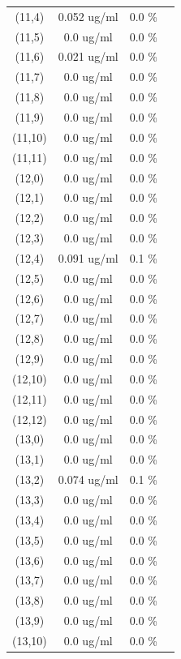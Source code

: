 \documentclass{article}
\begin{document}
\begin{tabular}{c c c c}
(11,4)&        0.052 ug/ml        &0.0 \%\\
(11,5)&        0.0 ug/ml        &0.0 \%\\
(11,6)&        0.021 ug/ml        &0.0 \%\\
(11,7)&        0.0 ug/ml        &0.0 \%\\
(11,8)&        0.0 ug/ml        &0.0 \%\\
(11,9)&        0.0 ug/ml        &0.0 \%\\
(11,10)&        0.0 ug/ml        &0.0 \%\\
(11,11)&        0.0 ug/ml        &0.0 \%\\
(12,0)&        0.0 ug/ml        &0.0 \%\\
(12,1)&        0.0 ug/ml        &0.0 \%\\
(12,2)&        0.0 ug/ml        &0.0 \%\\
(12,3)&        0.0 ug/ml        &0.0 \%\\
(12,4)&        0.091 ug/ml        &0.1 \%\\
(12,5)&        0.0 ug/ml        &0.0 \%\\
(12,6)&        0.0 ug/ml        &0.0 \%\\
(12,7)&        0.0 ug/ml        &0.0 \%\\
(12,8)&        0.0 ug/ml        &0.0 \%\\
(12,9)&        0.0 ug/ml        &0.0 \%\\
(12,10)&        0.0 ug/ml        &0.0 \%\\
(12,11)&        0.0 ug/ml        &0.0 \%\\
(12,12)&        0.0 ug/ml        &0.0 \%\\
(13,0)&        0.0 ug/ml        &0.0 \%\\
(13,1)&        0.0 ug/ml        &0.0 \%\\
(13,2)&        0.074 ug/ml        &0.1 \%\\
(13,3)&        0.0 ug/ml        &0.0 \%\\
(13,4)&        0.0 ug/ml        &0.0 \%\\
(13,5)&        0.0 ug/ml        &0.0 \%\\
(13,6)&        0.0 ug/ml        &0.0 \%\\
(13,7)&        0.0 ug/ml        &0.0 \%\\
(13,8)&        0.0 ug/ml        &0.0 \%\\
(13,9)&        0.0 ug/ml        &0.0 \%\\
(13,10)&        0.0 ug/ml        &0.0 \%\\

\end{tabular}
\end{document}
